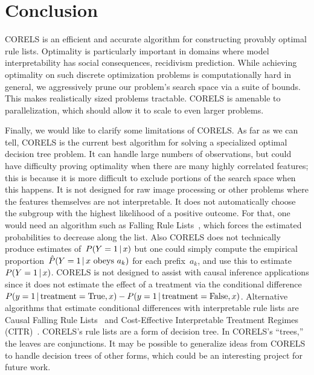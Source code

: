 \section{Conclusion}

CORELS is an efficient and accurate algorithm for constructing provably optimal rule lists.
%
Optimality is particularly important in domains where model interpretability
has social consequences, \eg recidivism prediction.
%
While achieving optimality on such discrete optimization problems is
computationally hard in general, we aggressively prune our problem's search space
via a suite of bounds.
%
This makes realistically sized problems tractable.
%
CORELS is amenable to parallelization, which should allow it to scale to
even larger problems.

\begin{arxiv}
Finally, we would like to clarify some limitations of CORELS.
%
As far as we can tell, CORELS is the current best algorithm for solving a
specialized optimal decision tree problem.
%
It can handle large numbers of observations, but could have difficulty proving
optimality when there are many highly correlated features; this is because it is
more difficult to exclude portions of the search space when this happens.
%
It is not designed for raw image processing or other problems where the features
themselves are not interpretable.
%
It does not automatically choose the subgroup with the highest likelihood of a
positive outcome.
%
For that, one would need an algorithm such as Falling Rule Lists~\citep{WangRu15},
which forces the estimated probabilities to decrease along the list.
%
Also CORELS does not technically produce estimates of~${P(Y=1 \,|\, x)}$ but one
could simply compute the empirical proportion~${\hat{P}(Y=1 \,|\, x \textrm{ obeys } a_k)}$
for each prefix~$a_k$, and use this to estimate~${P(Y=1 \,|\, x)}$.
%
CORELS is not designed to assist with causal inference applications since
it does not estimate the effect of a treatment via the conditional difference
${P(y=1 \,|\, \textrm{treatment} = \textrm{True}, x) - P(y=1 \,|\, \textrm{treatment} = \textrm{False}, x)}$.
%
Alternative algorithms that estimate conditional differences with interpretable
rule lists are Causal Falling Rule Lists~\citep{WangRu16}
and Cost-Effective Interpretable Treatment Regimes (CITR)~\citep{LakkarajuRu17}.
%
CORELS's rule lists are a form of decision tree.
%
In CORELS's ``trees,'' the leaves are conjunctions.
%
It may be possible to generalize ideas from CORELS to handle decision trees of
other forms, which could be an interesting project for future work.
\end{arxiv}
